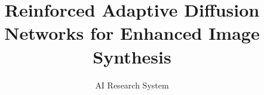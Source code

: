 \documentclass{article} %
\title{Reinforced Adaptive Diffusion Networks for Enhanced Image Synthesis}
\author{AI Research System}
\begin{document}
\maketitle

\begin{abstract}

\end{abstract}


















\end{document}

